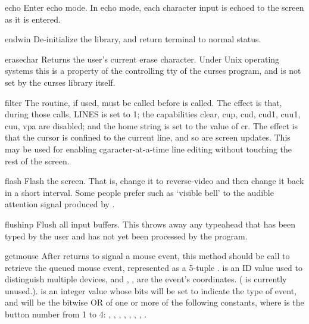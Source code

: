 \begin{funcdesc}{echo}{}
Enter echo mode.  In echo mode, each character input is echoed to the
screen as it is entered.  
\end{funcdesc}

\begin{funcdesc}{endwin}{}
De-initialize the library, and return terminal to normal status.
\end{funcdesc}

\begin{funcdesc}{erasechar}{}
Returns the user's current erase character.  Under Unix operating
systems this is a property of the controlling tty of the curses
program, and is not set by the curses library itself.
\end{funcdesc}

\begin{funcdesc}{filter}{}
The  routine, if used, must be called before
 is  called.  The effect is that, during those
calls, LINES is set to 1; the capabilities clear, cup, cud, cud1,
cuu1, cuu, vpa are disabled; and the home string is set to the value of cr.
The effect is that the cursor is confined to the current line, and so
are screen updates.  This may be used for enabling cgaracter-at-a-time 
line editing without touching the rest of the screen.
\end{funcdesc}

\begin{funcdesc}{flash}{}
Flash the screen.  That is, change it to reverse-video and then change
it back in a short interval.  Some people prefer such as `visible bell'
to the audible attention signal produced by .
\end{funcdesc}

\begin{funcdesc}{flushinp}{}
Flush all input buffers.  This throws away any  typeahead  that  has
been typed by the user and has not yet been processed by the program.
\end{funcdesc}

\begin{funcdesc}{getmouse}{}
After  returns  to signal a mouse
event, this method should be call to retrieve the queued mouse event,
represented as a 5-tuple
.
 is an ID value used to distinguish multiple devices,
and , ,  are the event's coordinates.  (
is currently unused.).   is an integer value whose bits
will be set to indicate the type of event, and will be the bitwise OR
of one or more of the following constants, where  is the button
number from 1 to 4:
,
,
,
,
,
,
,
.
\end{funcdesc}

